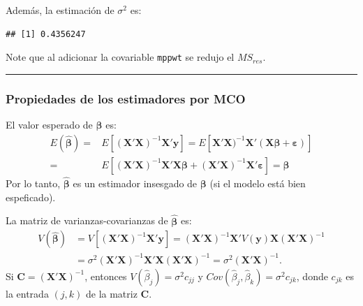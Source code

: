 \documentclass[
]{article}
\newenvironment{Shaded}{\begin{snugshade}}{\end{snugshade}}
\newcommand{\DecValTok}[1]{\textcolor[rgb]{0.00,0.00,0.81}{#1}}
\newcommand{\FunctionTok}[1]{\textcolor[rgb]{0.13,0.29,0.53}{\textbf{#1}}}
\newcommand{\NormalTok}[1]{#1}
\newcommand{\SpecialCharTok}[1]{\textcolor[rgb]{0.81,0.36,0.00}{\textbf{#1}}}
\begin{document}
Además, la estimación de \(\sigma^{2}\) es:

\begin{Shaded}
\end{Shaded}

\begin{verbatim}
## [1] 0.4356247
\end{verbatim}

Note que al adicionar la covariable \texttt{mppwt} se redujo el \(MS_{res}\).

\rule{\textwidth}{0.4pt}

\hypertarget{propiedades-de-los-estimadores-por-mco-1}{%
\subsubsection{Propiedades de los estimadores por MCO}\label{propiedades-de-los-estimadores-por-mco-1}}

El valor esperado de \(\widehat{\boldsymbol \beta}\) es:
\begin{equation}
\begin{split}
E(\widehat{\boldsymbol \beta}) =& E\left[ (\boldsymbol X'\boldsymbol X)^{-1}\boldsymbol X'\boldsymbol y\right] = E\left[ \boldsymbol X'\boldsymbol X)^{-1}\boldsymbol X'(\boldsymbol X\boldsymbol \beta+ \boldsymbol \varepsilon) \right] \\
=& E\left[ (\boldsymbol X'\boldsymbol X)^{-1}\boldsymbol X'\boldsymbol X\boldsymbol \beta+ (\boldsymbol X'\boldsymbol X)^{-1}\boldsymbol X'\boldsymbol \varepsilon\right] = \boldsymbol \beta
\end{split}
\nonumber
\end{equation}
Por lo tanto, \(\widehat{\boldsymbol \beta}\) es un estimador insesgado de \(\boldsymbol \beta\) (si el modelo está bien espeficado).

La matriz de varianzas-covarianzas de \(\widehat{\boldsymbol \beta}\) es:
\begin{equation}
\begin{split}
V(\widehat{\boldsymbol \beta}) &= V\left[ (\boldsymbol X'\boldsymbol X)^{-1}\boldsymbol X'\boldsymbol y\right] = (\boldsymbol X'\boldsymbol X)^{-1}\boldsymbol X'V(\boldsymbol y)\boldsymbol X(\boldsymbol X'\boldsymbol X)^{-1}  \\
&= \sigma^{2}(\boldsymbol X'\boldsymbol X)^{-1}\boldsymbol X'\boldsymbol X(\boldsymbol X'\boldsymbol X)^{-1} = \sigma^{2}(\boldsymbol X'\boldsymbol X)^{-1}.
\end{split}
\nonumber
\end{equation}
Si \(\boldsymbol C=(\boldsymbol X'\boldsymbol X)^{-1}\), entonces \(V(\widehat{\beta}_{j}) = \sigma^{2}c_{jj}\) y \(Cov(\widehat{\beta}_{j},\widehat{\beta}_{k})=\sigma^{2}c_{jk}\), donde \(c_{jk}\) es la entrada \((j,k)\) de la matriz \(\boldsymbol C\).
\end{document}
